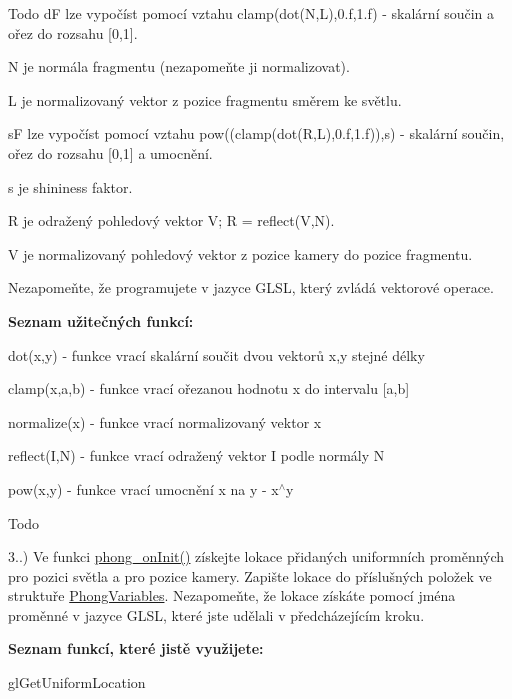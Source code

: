 \begin{DoxyRefDesc}{Todo}
 d\-F lze vypočíst pomocí vztahu clamp(dot(\-N,\-L),0.\-f,1.\-f) -\/ skalární součin a ořez do rozsahu \mbox{[}0,1\mbox{]}.\par
 N je normála fragmentu (nezapomeňte ji normalizovat).\par
 L je normalizovaný vektor z pozice fragmentu směrem ke světlu.\par
 s\-F lze vypočíst pomocí vztahu pow((clamp(dot(\-R,\-L),0.\-f,1.\-f)),s) -\/ skalární součin, ořez do rozsahu \mbox{[}0,1\mbox{]} a umocnění.\par
 s je shininess faktor.\par
 R je odražený pohledový vektor V; R = reflect(\-V,\-N).\par
 V je normalizovaný pohledový vektor z pozice kamery do pozice fragmentu.\par
 \par
 Nezapomeňte, že programujete v jazyce G\-L\-S\-L, který zvládá vektorové operace.\par
 {\bfseries Seznam užitečných funkcí\-:}
\begin{DoxyItemize}
\item dot(x,y) -\/ funkce vrací skalární součit dvou vektorů x,y stejné délky
\item clamp(x,a,b) -\/ funkce vrací ořezanou hodnotu x do intervalu \mbox{[}a,b\mbox{]}
\item normalize(x) -\/ funkce vrací normalizovaný vektor x
\item reflect(\-I,\-N) -\/ funkce vrací odražený vektor I podle normály N
\item pow(x,y) -\/ funkce vrací umocnění x na y -\/ x$^\wedge$y 
\end{DoxyItemize}\end{DoxyRefDesc}
\begin{DoxyRefDesc}{Todo}
\item[\hyperlink{todo__todo000006}{Todo}]3..) Ve funkci \hyperlink{student_8h_ac2adb2ba4e748239b9db4d037584d3cc}{phong\-\_\-on\-Init()} získejte lokace přidaných uniformních proměnných pro pozici světla a pro pozice kamery. Zapište lokace do příslušných položek ve struktuře \hyperlink{structPhongVariables}{Phong\-Variables}. Nezapomeňte, že lokace získáte pomocí jména proměnné v jazyce G\-L\-S\-L, které jste udělali v předcházejícím kroku.\par
 {\bfseries Seznam funkcí, které jistě využijete\-:}
\begin{DoxyItemize}
\item gl\-Get\-Uniform\-Location 
\end{DoxyItemize}\end{DoxyRefDesc}


